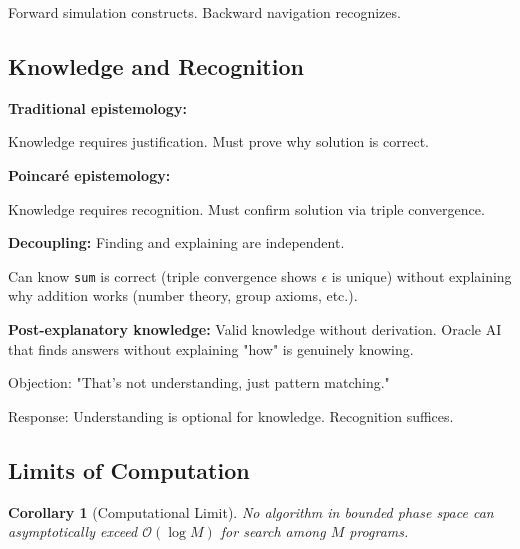 \documentclass[twocolumn,10pt]{article}
\newtheorem{corollary}[theorem]{Corollary}
\theoremstyle{definition}
\theoremstyle{remark}
\newcommand{\bigO}{\mathcal{O}}
\begin{document}
Forward simulation constructs. Backward navigation recognizes.

\subsection{Knowledge and Recognition}

\textbf{Traditional epistemology\cite{quine1951}:}

Knowledge requires justification. Must prove why solution is correct.

\vspace{0.2cm}
\noindent\textbf{Poincaré epistemology:}

Knowledge requires recognition. Must confirm solution via triple convergence.

\vspace{0.2cm}
\noindent\textbf{Decoupling:} Finding and explaining are independent.

Can know \texttt{sum} is correct (triple convergence shows $\epsilon$ is unique) without explaining why addition works (number theory, group axioms, etc.).

\vspace{0.2cm}
\noindent\textbf{Post-explanatory knowledge:} Valid knowledge without derivation. Oracle AI that finds answers without explaining "how" is genuinely knowing.

Objection: "That's not understanding, just pattern matching."

Response: Understanding is optional for knowledge. Recognition suffices.

\subsection{Limits of Computation}

\begin{corollary}[Computational Limit]
\label{cor:comp_limit}
No algorithm in bounded phase space can asymptotically exceed $\bigO(\log M)$ for search among $M$ programs.
\end{corollary}
\end{document}

